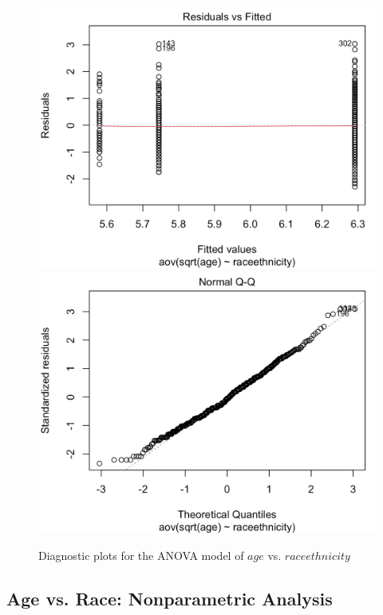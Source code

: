 \vspace{.2in}

\begin{figure}[h]
    \centering
    \includegraphics[scale=.35]{aov1_plot1.png}
    \includegraphics[scale=.35]{aov1_plot2.png}
    \caption{Diagnostic plots for the ANOVA model of $age$ vs. $raceethnicity$}
    \label{fig:aov1_plots}
\end{figure}

\subsection{Age vs. Race: Nonparametric Analysis}

